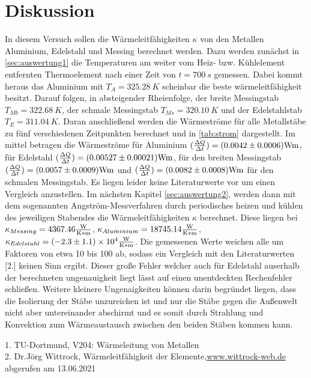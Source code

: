 \section{Diskussion}
In diesem Versuch sollen die Wärmeleitfähigkeiten $\kappa$ von den Metallen Aluminium, Edelstahl und Messing
berechnet werden. Dazu werden zunächst in \autoref{sec:auswertung1} die Temperaturen am weiter vom Heiz- bzw.
Kühlelement entfernten Thermoelement  nach einer Zeit von $t=\SI[]{700}[]{s}$ gemessen. Dabei kommt heraus das 
Aluminium mit $T_A=\SI[]{325.28}[]{K}$ scheinbar die beste wärmeleitfähigkeit besitzt. Darauf folgen, in absteigender
Rheienfolge, der breite Messingstab $T_{Mb}=\SI[]{322.68}[]{K}$, der schmale Messingstab $T_{Ms}=\SI[]{320.10}[]{K}$
und der Edelstahlstab $T_E=\SI[]{311.04}[]{K}$. Daran anschließend werden die Wärmeströme für alle Metallstäbe zu fünf
verschiedenen Zeitpunkten berechnet und in \autoref{tab:strom} dargestellt. Im mittel betragen die Wärmeströme für Aluminium
$(\frac{\Delta Q}{\Delta t})=(0.0042\pm 0.0006)\si[]{Wm}$, für Edelstahl $(\frac{\Delta Q}{\Delta t})=(0.00527\pm 0.00021)\si[]{Wm}$, 
für den breiten Messingstab$(\frac{\Delta Q}{\Delta t})=(0.0057\pm 0.0009)\si[]{Wm}$ und $(\frac{\Delta Q}{\Delta t})=(0.0082\pm 0.0008)\si[]{Wm}$
für den schmalen Messingstab. Es liegen leider keine Literaturwerte vor um einen Vergleich anzustellen. Im nächsten 
Kapitel \autoref{sec:auswertung2}, werden dann mit dem sogenannten Angström-Messverfahren durch periodisches heizen 
und kühlen des jeweiligen Stabendes die Wärmeleitfähigkeiten $\kappa$ berechnet. Diese liegen bei $\kappa_{Messing}=4367.46\si[]{\frac{W}{K*m}}$,
$\kappa_{Aluminium}=18745.14\si[]{\frac{W}{K*m}}$,  $\kappa_{Edelstahl}=(-2.3\pm 1.1)\times 10^{4}\si[]{\frac{W}{K*m}}$. 
Die gemessenen Werte weichen alle um Faktoren von etwa 10 bis 100 ab, sodass ein Vergleich mit den Literaturwerten 
[2.] keinen Sinn ergibt. Dieser  große Fehler welcher auch für Edelstahl auserhalb der berechneten ungenauigkeit 
liegt lässt auf einen unentdeckten Rechenfehler schließen. Weitere kleinere Ungenaigkeiten können darin begründet 
liegen, dass die Isolierung der Stäbe unzureichen ist und nur die Stäbe gegen die Außenwelt nicht aber untereinander
abschirmt und es somit durch Strahlung und Konvektion zum Wärmeaustausch zwischen den beiden Stäben kommen kann.

1. TU-Dortmund, V204: Wärmeleitung von Metallen\\
2. Dr.Jörg Wittrock, Wärmeleitfähigkeit der Elemente,\hyperlink{http://www.wittrock-web.de/pse_leit_th.html}{www.wittrock-web.de} abgerufen am 13.06.2021